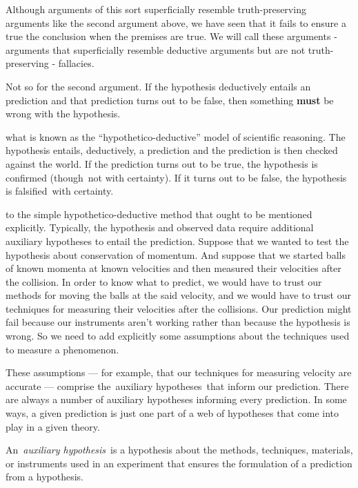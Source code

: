 \begin{refsection}
Although arguments of this sort superficially resemble truth-preserving arguments like the second argument above, we have seen that it fails to ensure a true the conclusion when the premises are true. We will call these arguments - arguments that superficially resemble deductive arguments but are not truth-preserving - fallacies.

Not so for the second argument. If the hypothesis deductively entails an prediction and that prediction turns out to be false, then something \textbf{must} be wrong with the hypothesis. 

 what is known as the ``hypothetico-deductive'' model of scientific reasoning. The hypothesis entails, deductively, a prediction and the prediction is then checked against the world. If the prediction turns out to be true, the hypothesis is confirmed (though not with certainty). If it turns out to be false, the hypothesis is falsified with certainty. 


 to the simple hypothetico-deductive method that ought to be mentioned explicitly. Typically, the hypothesis and observed data require additional auxiliary hypotheses to entail the prediction. Suppose that we wanted to test the hypothesis about conservation of momentum. And suppose that we started balls of known momenta at known velocities and then measured their velocities after the collision. In order to know what to predict, we would have to trust our methods for moving the balls at the said velocity, and we would have to trust our techniques for measuring their velocities after the collisions. Our prediction might fail because our instruments aren't working rather than because the hypothesis is wrong. So we need to add explicitly some assumptions about the techniques used to measure a phenomenon.

These assumptions --- for example, that our techniques for measuring velocity are accurate --- comprise the auxiliary hypotheses that inform our prediction. There are always a number of auxiliary hypotheses informing every prediction. In some ways, a given prediction is just one part of a web of hypotheses that come into play in a given theory.

\begin{thesis}\label{thesis:auxiliaryhypothesis}
An \emph{auxiliary hypothesis} is a hypothesis about the methods, techniques, materials, or instruments used in an experiment that ensures the formulation of a prediction from a hypothesis.\end{thesis}


\end{refsection}
